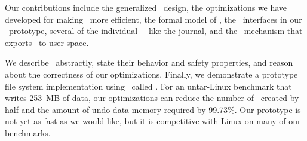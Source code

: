 Our contributions include the generalized \patch\ design, the
 optimizations we have developed for making \patches\ more efficient,
 the formal model of \patches, the \module\ interfaces in our \Kudos\
 prototype, several of the individual \Kudos\ \modules\ like the journal,
 and the \patchgroup\ mechanism that exports \patches\ to user space.


We describe \patches\ abstractly, state their behavior and safety
 properties, and reason about the correctness of our optimizations.
%
Finally, we demonstrate a prototype file system implementation using
 \patches\ called \Kudos.
%
For an untar-Linux benchmark that writes 253~MB of data, our optimizations
 can reduce the number of \patches\ created by half and the amount of
 undo data memory required by 99.73\%. 
%
Our prototype is not yet as fast as we would like, but it is competitive
 with Linux on many of our benchmarks.

